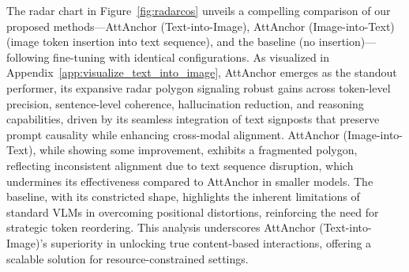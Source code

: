 \documentclass[11pt]{article}
\begin{document}
The radar chart in Figure~\ref{fig:radarcos} unveils a compelling comparison of our proposed methods—AttAnchor (Text-into-Image), AttAnchor (Image-into-Text) (image token insertion into text sequence), and the baseline (no insertion)—following fine-tuning with identical configurations. As visualized in Appendix~\ref{app:visualize_text_into_image}, AttAnchor emerges as the standout performer, its expansive radar polygon signaling robust gains across token-level precision, sentence-level coherence, hallucination reduction, and reasoning capabilities, driven by its seamless integration of text signposts that preserve prompt causality while enhancing cross-modal alignment. AttAnchor (Image-into-Text), while showing some improvement, exhibits a fragmented polygon, reflecting inconsistent alignment due to text sequence disruption, which undermines its effectiveness compared to AttAnchor in smaller models. The baseline, with its constricted shape, highlights the inherent limitations of standard VLMs in overcoming positional distortions, reinforcing the need for strategic token reordering. This analysis underscores AttAnchor (Text-into-Image)'s superiority in unlocking true content-based interactions, offering a scalable solution for resource-constrained settings.
\end{document}
